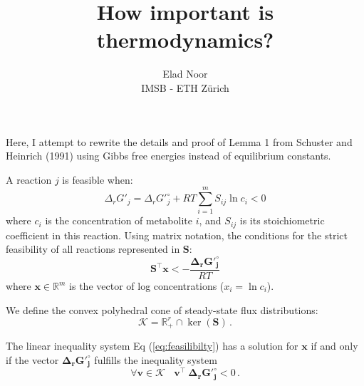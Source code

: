 \documentclass[12pt]{article}
\newenvironment{lemma}[2][Lemma]{\begin{trivlist}
\item[\hskip \labelsep {\bfseries #1}\hskip \labelsep {\bfseries #2.}]}{\end{trivlist}}
\begin{document}
 
 
 
\title{How important is thermodynamics?}%
\author{Elad Noor\\ %
IMSB - ETH Z\"{u}rich} %
 
\maketitle

Here, I attempt to rewrite the details and proof of Lemma 1 from Schuster and Heinrich (1991) using Gibbs free energies instead of equilibrium constants.

A reaction $j$ is feasible when:
\begin{equation}
    \Delta_r G'_j = \Delta_r G'^\circ_j + RT \sum_{i=1}^{m} S_{ij} \ln{c_i} < 0
\end{equation}
where $c_i$ is the concentration of metabolite $i$, and $S_{ij}$ is its stoichiometric coefficient in this reaction. Using matrix notation, the conditions for the strict feasibility of all reactions represented in $\mathbf{S}$:
\begin{equation}\label{eq:feasilibilty}
    \mathbf{S}^\top \mathbf{x} < -\frac{\mathbf{\Delta_r G'^\circ_j}}{RT}
\end{equation}
where $\mathbf{x} \in \mathbb{R}^m$ is the vector of log concentrations ($x_i = \ln{c_i}$).

We define the convex polyhedral cone of steady-state flux distributions:
\begin{equation}
    \mathcal{K} = \mathbb{R}_+^r \cap \ker(\mathbf{S})\,.
\end{equation}

\begin{lemma}{1}
The linear inequality system Eq (\ref{eq:feasilibilty}) has a solution for $\mathbf{x}$ if and only if the vector $\mathbf{\Delta_r G'^\circ_j}$ fulfills the inequality system
\begin{equation}\label{eq:negative_product}
    \forall \mathbf{v} \in \mathcal{K}~~~~\mathbf{v}^\top~\mathbf{\Delta_r G'^\circ_j} < 0\,.
\end{equation}
\end{lemma}
 
\end{document}
